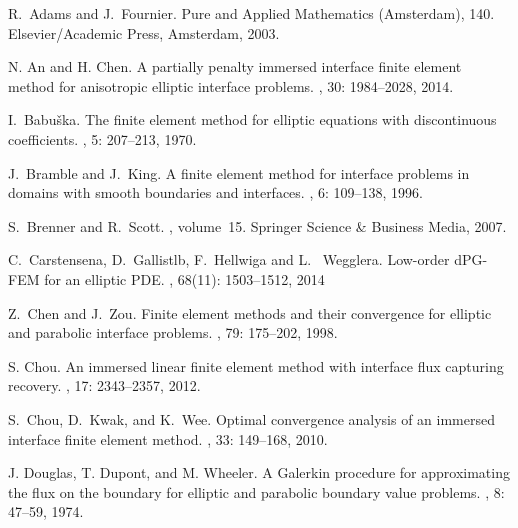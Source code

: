 \documentclass[11pt]{article}
\numberwithin{equation}{section}
\begin{document}
\begin{thebibliography}{99}
R.~Adams and J.~Fournier.
 \newblock Pure and Applied Mathematics (Amsterdam), 140. Elsevier/Academic Press, Amsterdam, 2003.

N. An and H. Chen.
\newblock A partially penalty immersed interface finite element method for anisotropic elliptic interface problems.
, 30: 1984--2028, 2014.

I.~Babu\v{s}ka.
The finite element method for elliptic equations with  discontinuous coefficients.
, 5:  207--213, 1970.

J.~Bramble and J.~King.
A finite element method for interface problems in domains with smooth boundaries and interfaces.
 ,  6:  109--138, 1996.

S.~Brenner and R.~Scott.
, volume~15.
\newblock Springer Science \& Business Media, 2007.

C.~Carstensena, D.~Gallistlb, F.~Hellwiga and L.~ Wegglera.
Low-order d{PG}-{FEM} for an elliptic {PDE}.
,
68(11): 1503--1512, 2014

Z.~Chen and J.~Zou.
Finite element methods and their convergence for  elliptic and parabolic interface problems.
, 79:  175--202, 1998.

S. Chou.
 An immersed linear finite element method with interface flux capturing recovery.
, 17: 2343--2357, 2012.

S.~Chou, D.~Kwak, and K.~Wee.
Optimal convergence analysis of an immersed interface finite element method.
, 33:  149--168, 2010.

J. Douglas, T. Dupont, and M. Wheeler.
A {G}alerkin procedure for approximating the flux on the boundary for elliptic and parabolic boundary value problems.
, 8: 47--59, 1974.


\end{thebibliography}
\end{document}
